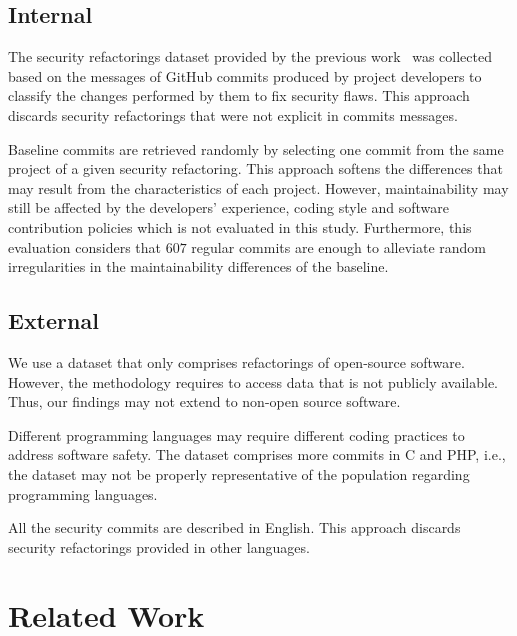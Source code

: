 \documentclass[10pt,conference]{IEEEtran}
\begin{document}
{\subsection{Internal}

The security refactorings dataset provided by the previous
work~\cite{Reis:2017:IJSSE} was collected based on the messages of GitHub
commits produced by project developers to classify the changes performed by them
to fix security flaws. This approach discards security refactorings that were
not explicit in commits messages.

Baseline commits are retrieved randomly by selecting one commit from the same
project of a given security refactoring. This approach softens the differences
that may result from the characteristics of each project. However,
maintainability may still be affected by the developers' experience, coding
style and software contribution policies which is not evaluated in this study.
Furthermore, this evaluation considers that $607$ regular commits are enough to
alleviate random irregularities in the maintainability differences of the
baseline.

\subsection{External}

We use a dataset that only comprises refactorings of open-source software.
However, the methodology requires to access data that is not publicly available.
Thus, our findings may not extend to non-open source software.

Different programming languages may require different coding practices to
address software safety. The dataset comprises more commits in C and PHP, i.e.,
the dataset may not be properly representative of the population regarding
programming languages.

All the security commits are described in English. This approach discards
security refactorings provided in other languages.

\section{Related Work}\label{sec:rw}

}
\end{document}
